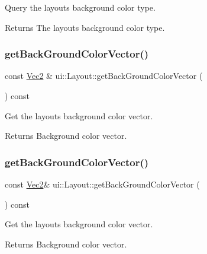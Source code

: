 Query the layout\textquotesingle{}s background color type. \begin{DoxyReturn}{Returns}
The layout\textquotesingle{}s background color type. 
\end{DoxyReturn}
\mbox{\label{classui_1_1Layout_a5480d653a8c352f30dbd9088b0ebca1f}} 
\subsubsection{\texorpdfstring{get\+Back\+Ground\+Color\+Vector()}{getBackGroundColorVector()}\hspace{0.1cm}{\footnotesize\ttfamily [1/2]}}
{\footnotesize\ttfamily const \hyperlink{classVec2}{Vec2} \& ui\+::\+Layout\+::get\+Back\+Ground\+Color\+Vector (\begin{DoxyParamCaption}{ }\end{DoxyParamCaption}) const}

Get the layout\textquotesingle{}s background color vector. \begin{DoxyReturn}{Returns}
Background color vector. 
\end{DoxyReturn}
\mbox{\label{classui_1_1Layout_a940e42417f3342d05b69c7526fd9c547}} 
\subsubsection{\texorpdfstring{get\+Back\+Ground\+Color\+Vector()}{getBackGroundColorVector()}\hspace{0.1cm}{\footnotesize\ttfamily [2/2]}}
{\footnotesize\ttfamily const \hyperlink{classVec2}{Vec2}\& ui\+::\+Layout\+::get\+Back\+Ground\+Color\+Vector (\begin{DoxyParamCaption}{ }\end{DoxyParamCaption}) const}

Get the layout\textquotesingle{}s background color vector. \begin{DoxyReturn}{Returns}
Background color vector. 
\end{DoxyReturn}
\mbox{\label{classui_1_1Layout_a6906e65eb8e0c88b1e1e1e32148f7bc8}} 
